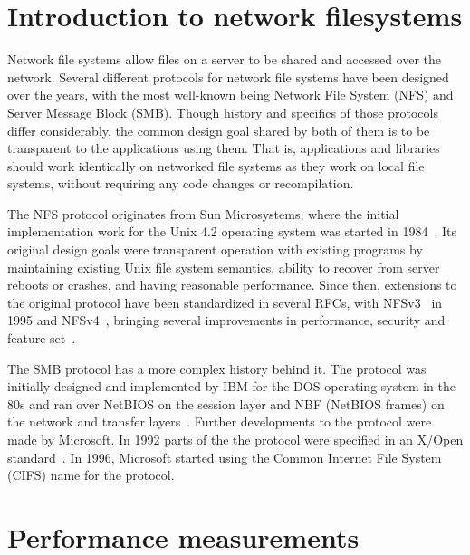 \section{Introduction to network filesystems}

Network file systems allow files on a server to be shared and accessed over the network.
Several different protocols for network file systems have been designed over the years,
with the most well-known being Network File System (NFS) and 
Server Message Block (SMB).
Though history and specifics of those protocols differ considerably, the common design
goal shared by both of them is to be transparent to the applications using them.
That is, applications and libraries should work identically on networked file systems
as they work on local file systems, without requiring any code changes or recompilation.

The NFS protocol originates from Sun Microsystems, where the initial implementation work for the
Unix 4.2 operating system was started in 1984~\cite{NFS}. Its original design goals were
transparent operation with existing programs by maintaining existing Unix file system
semantics, ability to recover from server reboots or crashes, and having reasonable
performance. Since then, extensions to the original protocol have been standardized
in several RFCs, with NFSv3~\cite{NFSv3RFC} in 1995 and NFSv4~\cite{NFSv4RFC},
bringing several improvements in performance, security and feature set~\cite{NFSv4Better}.

The SMB protocol has a more complex history behind it. The protocol was initially designed
and implemented by IBM for the DOS operating system in the 80s
and ran over NetBIOS on the session layer and NBF (NetBIOS frames) on the network and transfer layers~\cite{CifsBook}.
Further developments to the protocol were made by Microsoft.
In 1992 parts of the the protocol were specified in an X/Open standard~\cite{XopenSmbSpec}.
In 1996, Microsoft started using the Common Internet File System (CIFS) name for the protocol.

\section{Performance measurements}

